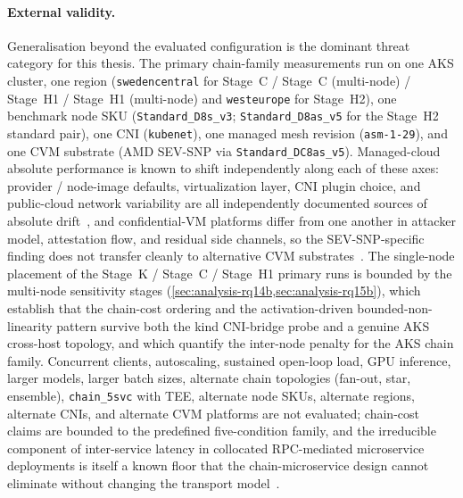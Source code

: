 \paragraph{External validity.}
Generalisation beyond the evaluated configuration is the dominant
threat category for this thesis. The primary chain-family
measurements run on one AKS cluster, one region
(\texttt{swedencentral} for Stage~C / Stage~C (multi-node) / Stage~H1 / Stage~H1 (multi-node) and
\texttt{westeurope} for Stage~H2), one benchmark node SKU
(\texttt{Standard\_D8s\_v3}; \texttt{Standard\_D8as\_v5} for the
Stage~H2 standard pair), one CNI (\texttt{kubenet}), one managed mesh
revision (\texttt{asm-1-29}), and one CVM substrate (AMD SEV-SNP via
\texttt{Standard\_DC8as\_v5}). Managed-cloud absolute performance is
known to shift independently along each of these axes: provider /
node-image defaults, virtualization layer, CNI plugin choice, and
public-cloud network variability are all independently documented
sources of absolute
drift~\cite{managed_k8s_perf,virtualization_costs,cni_k8s_ic2e21,%
noise_in_clouds}, and confidential-VM platforms differ from one
another in attacker model, attestation flow, and residual side
channels, so the SEV-SNP-specific finding does not transfer cleanly
to alternative CVM
substrates~\cite{guanciale2022_confidential_quartet}. The single-node
placement of the Stage~K / Stage~C / Stage~H1 primary runs is bounded
by the multi-node sensitivity stages
(\cref{sec:analysis-rq14b,sec:analysis-rq15b}), which establish that
the chain-cost ordering and the activation-driven bounded-non-linearity
pattern survive both the kind CNI-bridge probe and a genuine AKS
cross-host topology, and which quantify the inter-node penalty for
the AKS chain family. Concurrent clients, autoscaling, sustained
open-loop load, GPU inference, larger models, larger batch sizes,
alternate chain topologies (fan-out, star, ensemble),
\texttt{chain\_5svc} with TEE, alternate node SKUs, alternate regions,
alternate CNIs, and alternate CVM platforms are not evaluated;
chain-cost claims are bounded to the predefined five-condition family,
and the irreducible component of inter-service latency in collocated
RPC-mediated microservice deployments is itself a known floor that
the chain-microservice design cannot eliminate without changing the
transport model~\cite{rpc_overhead_hotos25,notnets_apsys24}.

